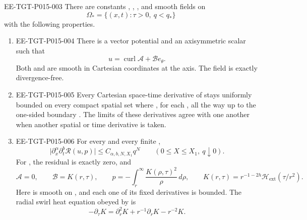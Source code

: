 \begin{theorem}\label{thm:3.1}
\begin{EESegment}{EE-TGT-P015-003}
There are constants ,
, , and smooth
fields on
\[
\Omega_* = \{(x,t):\tau>0,\ q<q_*\}
\]
with the following properties.
\end{EESegment}
\begin{enumerate}[label=\textup{(\roman*)},leftmargin=*]
\item
\begin{EESegment}{EE-TGT-P015-004}
There is a vector potential  and an axisymmetric scalar
 such that
\begin{equation}
u=\operatorname{curl}\mathcal A+\mathcal B e_\theta.
\tag{3.3}\label{eq:3.3}
\end{equation}
Both  and  are smooth
in Cartesian coordinates at the axis. The field is exactly divergence-free.
\end{EESegment}

\item
\begin{EESegment}{EE-TGT-P015-005}
Every Cartesian space-time derivative of
 stays uniformly bounded on every
compact spatial set where , for each
, all the way up to the one-sided boundary
. The limits of these derivatives
agree with one another when another spatial or time derivative is taken.
\end{EESegment}

\item
\begin{EESegment}{EE-TGT-P015-006}
For every  and every finite
,
\begin{equation}
\lvert\partial_x^\alpha\partial_t^b\mathscr R(u,p)\rvert
\leq C_{\alpha,b,N,X_1}q^N
\qquad (0\leq X\leq X_1,\ q\downarrow0).
\tag{3.4}\label{eq:3.4}
\end{equation}
For , the residual is exactly zero, and
\begin{equation}
\mathcal A=0,
\qquad \mathcal B=K(r,\tau),
\qquad p=-\int_r^\infty\frac{K(\rho,\tau)^2}{\rho}\,d\rho,
\qquad K(r,\tau)=r^{-1-2h}\mathcal H_{\mathrm{ext}}(\tau/r^2).
\tag{3.5}\label{eq:3.5}
\end{equation}
Here  is smooth on
\NSi{NS-F-P015-027}{[0,\infty)}, and each one of its fixed derivatives is bounded. The
radial swirl heat equation obeyed by  is
\[
-\partial_\tau K=\partial_r^2K+r^{-1}\partial_rK-r^{-2}K.
\]
\end{EESegment}


\end{enumerate}
\end{theorem}
